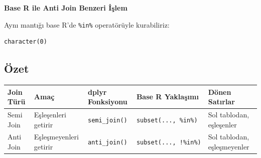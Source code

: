 \documentclass[
  letterpaper,
  DIV=11,
  numbers=noendperiod]{scrreprt}
\newenvironment{Shaded}{\begin{snugshade}}{\end{snugshade}}
\newcommand{\FunctionTok}[1]{\textcolor[rgb]{0.28,0.35,0.67}{#1}}
\newcommand{\NormalTok}[1]{\textcolor[rgb]{0.00,0.23,0.31}{#1}}
\newcommand{\OtherTok}[1]{\textcolor[rgb]{0.00,0.23,0.31}{#1}}
\newcommand{\SpecialCharTok}[1]{\textcolor[rgb]{0.37,0.37,0.37}{#1}}
\begin{document}
\textbf{Base R ile Anti Join Benzeri İşlem}

Aynı mantığı base R'de \texttt{\%in\%} operatörüyle kurabiliriz:

\begin{Shaded}
\end{Shaded}

\begin{verbatim}
character(0)
\end{verbatim}

\subsection*{Özet}\label{uxf6zet-1}

\begin{longtable}[]{@{}
  >{\raggedright\arraybackslash}p{}
  >{\raggedright\arraybackslash}p{}
  >{\raggedright\arraybackslash}p{}
  >{\raggedright\arraybackslash}p{}
  >{\raggedright\arraybackslash}p{}@{}}
\toprule\noalign{}
\begin{minipage}[b]{\linewidth}\raggedright
Join Türü
\end{minipage} & \begin{minipage}[b]{\linewidth}\raggedright
Amaç
\end{minipage} & \begin{minipage}[b]{\linewidth}\raggedright
dplyr Fonksiyonu
\end{minipage} & \begin{minipage}[b]{\linewidth}\raggedright
Base R Yaklaşımı
\end{minipage} & \begin{minipage}[b]{\linewidth}\raggedright
Dönen Satırlar
\end{minipage} \\
\midrule\noalign{}
\endhead
\bottomrule\noalign{}
\endlastfoot
Semi Join & Eşleşenleri getirir & \texttt{semi\_join()} &
\texttt{subset(...,\ \%in\%)} & Sol tablodan, eşleşenler \\
Anti Join & Eşleşmeyenleri getirir & \texttt{anti\_join()} &
\texttt{subset(...,\ !\%in\%)} & Sol tablodan, eşleşmeyenler \\
\end{longtable}
\end{document}
